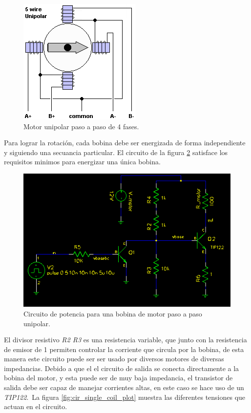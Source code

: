 \begin{figure}[htp]
\centering
\includegraphics[scale=0.5]{./img/5wire.png}
\caption{Motor unipolar paso a paso de 4 fases.}
\label{fig:stepper_motor_5_wire}
\end{figure}

Para lograr la rotaci\'on, cada bobina debe ser energizada de forma
independiente y siguiendo una secuancia particular. El circuito de la figura
\ref{fig:cir_single_coil} satisface los requisitos minimos para energizar una
\'unica bobina.

\begin{figure}[htp]
\centering
\includegraphics[scale=0.7]{./img/cir_single_coil.png}
\caption{Circuito de potencia para una bobina de motor paso a paso unipolar.}
\label{fig:cir_single_coil}
\end{figure}

El divisor resistivo \emph{R2 R3} es una resistencia variable, que junto con
la resistencia de emisor de 1 \ohm  permiten controlar la corriente que circula
por la bobina, de esta manera este circuito puede ser ser usado por diversos
motores de diversas impedancias. Debido a que el el circuito de salida se
conecta directamente a la bobina del motor, y esta puede ser de muy baja
impedancia, el transistor de salida debe ser capaz de manejar corrientes altas,
en este caso se hace uso de un \emph{TIP122}.\
La figura \ref{fig:cir_single_coil_plot} muestra las diferentes tensiones que
actuan en el circuito. 

